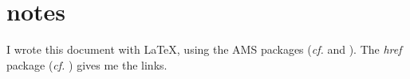 
\section{notes}
I wrote this document with \LaTeX{}, using the AMS packages (\emph{cf.} \cite{bib:amsinstr} and \cite{bib:amsusersg}). The \emph{href} package (\emph{cf.} \cite{bib:hrefpack}) gives me the links.

